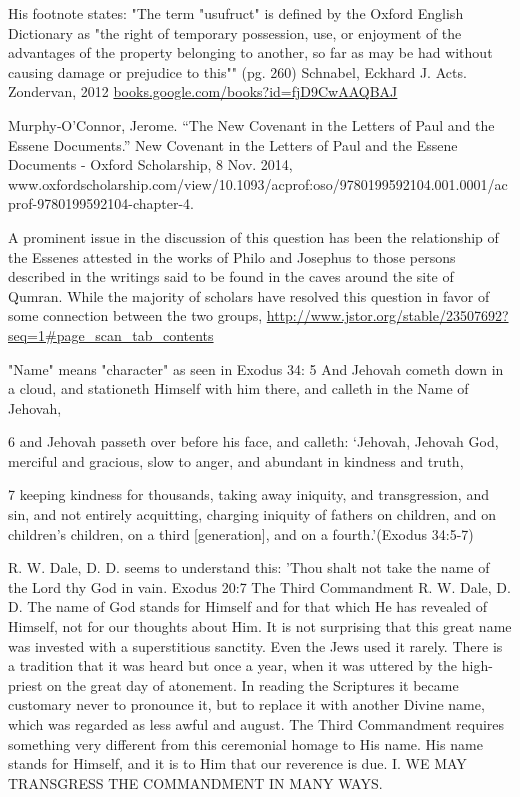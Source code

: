 \documentclass[11pt]{article}
\begin{document}
\begin{thebibliography}{37}
His footnote states: "The term "usufruct" is defined by the Oxford English Dictionary as "the right of temporary possession, use, or enjoyment of the advantages of the property belonging to another, so far as may be had without causing damage or prejudice to this""
(pg. 260)
Schnabel, Eckhard J. Acts. Zondervan, 2012
\url{books.google.com/books?id=fjD9CwAAQBAJ}

Murphy‐O'Connor, Jerome. “The New Covenant in the Letters of Paul and the Essene Documents.” New Covenant in the Letters of Paul and the Essene Documents - Oxford Scholarship, 8 Nov. 2014, www.oxfordscholarship.com/view/10.1093/acprof:oso/9780199592104.001.0001/acprof-9780199592104-chapter-4.

A prominent issue in the discussion of this question has been the relationship of the Essenes attested in the works of Philo and Josephus to those persons described in the writings said to be found in the caves around the site of Qumran. While the majority of scholars have resolved this question in favor of some connection between the two groups,
\url{http://www.jstor.org/stable/23507692?seq=1#page_scan_tab_contents}

"Name" means "character" as seen in Exodus 34:
5 And Jehovah cometh down in a cloud, and stationeth Himself with him there, and calleth in the Name of Jehovah,

6 and Jehovah passeth over before his face, and calleth: `Jehovah, Jehovah God, merciful and gracious, slow to anger, and abundant in kindness and truth,

7 keeping kindness for thousands, taking away iniquity, and transgression, and sin, and not entirely acquitting, charging iniquity of fathers on children, and on children's children, on a third [generation], and on a fourth.'(Exodus 34:5-7)

R. W. Dale, D. D. seems to understand this:\newline
'Thou shalt not take the name of the Lord thy God in vain.\newline
Exodus 20:7\newline
The Third Commandment\newline
R. W. Dale, D. D.\newline
The name of God stands for Himself and for that which He has revealed of Himself, not for our thoughts about Him. It is not surprising that this great name was invested with a superstitious sanctity. Even the Jews used it rarely. There is a tradition that it was heard but once a year, when it was uttered by the high-priest on the great day of atonement. In reading the Scriptures it became customary never to pronounce it, but to replace it with another Divine name, which was regarded as less awful and august. The Third Commandment requires something very different from this ceremonial homage to His name. His name stands for Himself, and it is to Him that our reverence is due. \newline \newline
I. WE MAY TRANSGRESS THE COMMANDMENT IN MANY WAYS.\newline


\end{thebibliography}
\end{document}
